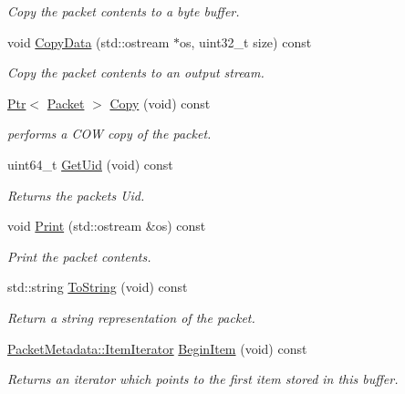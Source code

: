 \begin{DoxyCompactItemize}
\begin{DoxyCompactList}\small\item\em Copy the packet contents to a byte buffer. \end{DoxyCompactList}\item 
void \hyperlink{classns3_1_1Packet_a62f6ad90367d0f86db3a5f39589c6897}{Copy\+Data} (std\+::ostream $\ast$os, uint32\+\_\+t size) const 
\begin{DoxyCompactList}\small\item\em Copy the packet contents to an output stream. \end{DoxyCompactList}\item 
\hyperlink{classns3_1_1Ptr}{Ptr}$<$ \hyperlink{classns3_1_1Packet}{Packet} $>$ \hyperlink{classns3_1_1Packet_a5d5c70802a5f77fc5f0001e0cfc1898b}{Copy} (void) const 
\begin{DoxyCompactList}\small\item\em performs a C\+OW copy of the packet. \end{DoxyCompactList}\item 
uint64\+\_\+t \hyperlink{classns3_1_1Packet_a1f212c825b50e54d94f5b9ae99592e6a}{Get\+Uid} (void) const 
\begin{DoxyCompactList}\small\item\em Returns the packet\textquotesingle{}s Uid. \end{DoxyCompactList}\item 
void \hyperlink{classns3_1_1Packet_aa34058a5cdbf94673531f8c4001ab227}{Print} (std\+::ostream \&os) const 
\begin{DoxyCompactList}\small\item\em Print the packet contents. \end{DoxyCompactList}\item 
std\+::string \hyperlink{classns3_1_1Packet_a2474139f184f81df37f35b99efdc66f1}{To\+String} (void) const 
\begin{DoxyCompactList}\small\item\em Return a string representation of the packet. \end{DoxyCompactList}\item 
\hyperlink{classns3_1_1PacketMetadata_1_1ItemIterator}{Packet\+Metadata\+::\+Item\+Iterator} \hyperlink{classns3_1_1Packet_a0951ffaa12e116b03c4888085280501d}{Begin\+Item} (void) const 
\begin{DoxyCompactList}\small\item\em Returns an iterator which points to the first \textquotesingle{}item\textquotesingle{} stored in this buffer. \end{DoxyCompactList}\item 

\end{DoxyCompactItemize}
